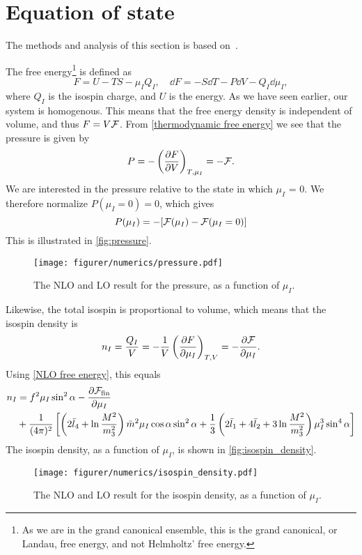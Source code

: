 \section{Equation of state}
The methods and analysis of this section is based on~\cite{Peskin:IntroQFT,Andersen:two-flavor-chpt,andersen2012introduction}.

The free energy\footnote{As we are in the grand canonical ensemble, this is the grand canonical, or Landau, free energy, and not Helmholtz' free energy.}
is defined as
\begin{equation}
    \label{thermodynamic free energy}
    F = U - TS - \mu_I Q_I, \quad \dd F = - S \dd T - P \dd V - Q_I \dd \mu_I ,
\end{equation}
where $Q_I$ is the isospin charge, and $U$ is the energy.
As we have seen earlier, our system is homogenous.
This means that the free energy density is independent of volume, and thus $F = V \mathcal{F}$.
From  \cref{thermodynamic free energy} we see that the pressure is given by
\begin{equation}
    P = - \left(\diffp{F}{V}\right)_{T, \mu_I} = - \Ef.
\end{equation}
We are interested in the pressure relative to the state in which $\mu_I$ = 0. We therefore normalize $P(\mu_I=0) = 0$, which gives  
\begin{equation}
    P(\mu_I) = -[\mathcal{F}(\mu_I) - \mathcal{F}(\mu_I = 0)]
\end{equation}
This is illustrated in \autoref{fig:pressure}.
\begin{figure}[h]
    \centering
    \vspace{-0.2cm}
    \texttt{[image: figurer/numerics/pressure.pdf]}
    \caption{The NLO and LO result for the pressure, as a function of $\mu_I$.}
    \label{fig:pressure}
\end{figure}

Likewise, the total isospin is proportional to volume, which means that the isospin density is
\begin{equation}
    n_I = \frac{Q_I}{V} = - \frac{1}{V} \left(\diffp{F}{\mu_I}\right)_{T, V}
    = - \diffp{\Ef}{\mu_I}.
\end{equation}
Using \cref{NLO free energy}, this equals
\begin{align}
    \nonumber
    n_I & = 
    f^2 \mu_I \sin^2 \alpha
    - \diffp{\Ef_\mathrm{fin}}{\mu_I} \\
    & + \frac{1}{(4 \pi)^2}
    \left[
            \left(2\bar l_4+\ln\frac{M^2}{m_3^2}\right)\bar m^2 \mu_I \cos\alpha \sin^2 \alpha
            +\frac{1}{3}\left(2\bar l_1 + 4 \bar l_2 + 3\ln\frac{M^2}{m_3^2}\right)\mu_I^3 \sin^4 \alpha
    \right]
\end{align}
The isospin density, as a function of $\mu_I$, is shown in \autoref{fig:isospin_density}.
\begin{figure}[h]
    \centering
    \vspace{-0.2cm}
    \texttt{[image: figurer/numerics/isospin\_density.pdf]}
    \caption{The NLO and LO result for the isospin density, as a function of $\mu_I$.}
    \label{fig:isospin_density}
\end{figure}

